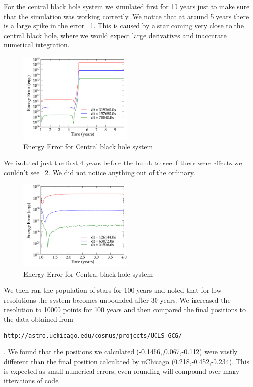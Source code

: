 \documentclass[11pt,letterpaper]{article}
\begin{document}
For the central black hole system we simulated first for 10 years just to make 
sure that the simulation was working correctly. We notice that at around 5 years
there is a large spike in the error ~\ref{fig:4a}. This is caused by a star
coming very close to the central black hole, where we would expect large 
derivatives and inaccurate numerical integration. 

\begin{figure}[bth]
\centering
\includegraphics[width=0.5\textwidth]{4a.pdf}
\caption{Energy Error for Central black hole system}
\label{fig:4a}
\end{figure}

We isolated just the first 4 years before the bumb to see if there were effects
we couldn't see ~\ref{fig:4b}. We did not notice anything out of the ordinary.

\begin{figure}[bth]
\centering
\includegraphics[width=0.5\textwidth]{4b.pdf}
\caption{Energy Error for Central black hole system}
\label{fig:4b}
\end{figure}

We then ran the population of stars for 100 years and noted that for low
resolutions the system becomes unbounded after 30 years. We increased the 
resolution to 10000 points for 100 years and then compared the final 
positions to the data obtained from \begin{verbatim}
http://astro.uchicago.edu/cosmus/projects/UCLS_GCG/ \end{verbatim}. 
We found that the positions
we calculated (-0.1456,,0.067,-0.112) were vastly different than the final 
position calculated by uChicago (0.218,-0.452,-0.234). This
is expected as small numerical errors, even rounding will compound over many 
itterations of code. 
\end{document}
